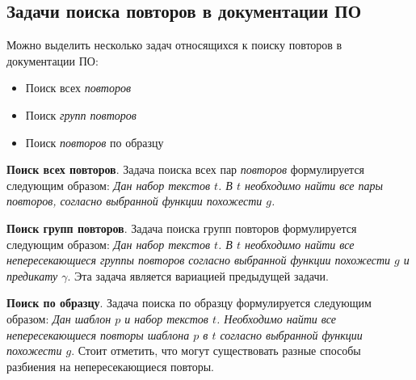 
\subsection{Задачи поиска повторов в документации ПО}

Можно выделить несколько задач относящихся к поиску повторов в документации ПО:
\begin{itemize}
    \item Поиск всех \emph{повторов}
    \item Поиск \emph{групп повторов}
    \item Поиск \emph{повторов} по образцу
\end{itemize}

\textbf{Поиск всех повторов}.
Задача поиска всех пар \emph{повторов} формулируется следующим образом: \emph{Дан набор текстов $t$. В $t$ необходимо найти все пары повторов,  согласно выбранной функции похожести $g$.
}

\textbf{Поиск групп повторов}.
Задача поиска групп повторов формулируется следующим образом:
\emph{Дан набор  текстов $t$. В $t$ необходимо найти все непересекающиеся группы повторов согласно выбранной функции похожести $g$ и предикату $\gamma$}.
Эта задача является вариацией предыдущей задачи.

\textbf{Поиск по образцу}.
Задача поиска по образцу формулируется следующим образом:
\emph{Дан шаблон $p$ и набор текстов $t$. Необходимо найти все непересекающиеся повторы шаблона $p$ в  $t$ согласно выбранной функции похожести $g$}. Стоит отметить, что могут существовать разные способы разбиения на непересекающиеся повторы.













